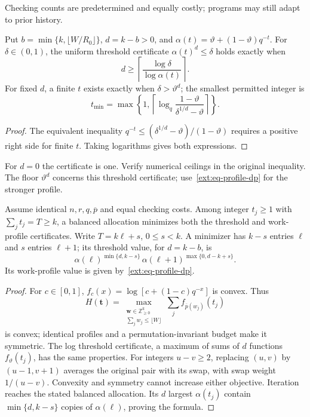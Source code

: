 Checking counts are predetermined and equally costly; programs may still
adapt to prior history.

\begin{corollary}
\label{ext:cor-target}
Put $b=\min\{k,\lfloor W/R_0\rfloor\}$, $d=k-b>0$, and
$\alpha(t)=\vartheta+(1-\vartheta)q^{-t}$.
For $\delta\in(0,1)$, the uniform threshold certificate
$\alpha(t)^d\le\delta$ holds exactly when
\[
d\ge\left\lceil\frac{\log\delta}{\log\alpha(t)}\right\rceil.
\]
For fixed $d$, a finite $t$ exists exactly when $\delta>\vartheta^d$;
the smallest permitted integer is
\begin{equation}
t_{\min}=\max\left\{1,
\left\lceil\log_q\frac{1-\vartheta}{\delta^{1/d}-\vartheta}\right\rceil
\right\}.
\label{ext:eq-target-t}
\end{equation}
\end{corollary}

\begin{proof}
The equivalent inequality
$q^{-t}\le(\delta^{1/d}-\vartheta)/(1-\vartheta)$ requires a positive
right side for finite $t$. Taking logarithms gives both expressions.
\end{proof}

For $d=0$ the certificate is one. Verify numerical ceilings in the original
inequality. The floor $\vartheta^d$ concerns this threshold certificate;
use~\eqref{ext:eq-profile-dp} for the stronger profile.

\begin{theorem}
\label{ext:thm-balanced}
Assume identical $n,r,q,\overline p$ and equal checking costs. Among integer
$t_j\ge1$ with $\sum_jt_j=T\ge k$, a balanced allocation minimizes both
the threshold and work-profile certificates. Write $T=k\ell+s$,
$0\le s<k$. A minimizer has $k-s$ entries $\ell$ and $s$ entries $\ell+1$;
its threshold value, for $d=k-b$, is
\begin{equation}
\alpha(\ell)^{\min\{d,k-s\}}\,
\alpha(\ell+1)^{\max\{0,d-k+s\}}.
\label{ext:eq-balanced-threshold}
\end{equation}
Its work-profile value is given by~\eqref{ext:eq-profile-dp}.
\end{theorem}

\begin{proof}
For $c\in[0,1]$, $f_c(x)=\log[c+(1-c)q^{-x}]$ is convex. Thus
\[
H(\mathbf t)=
\max_{\substack{\mathbf w\in\mathbb Z_{\ge0}^k\\
                \sum_jw_j\le\lfloor W\rfloor}}
\sum_j f_{\overline p(w_j)}(t_j)
\]
is convex; identical profiles and a permutation-invariant budget make it
symmetric. The log threshold certificate, a maximum of sums of $d$
functions $f_\vartheta(t_j)$, has the same properties.
For integers $u-v\ge2$, replacing $(u,v)$ by $(u-1,v+1)$ averages the
original pair with its swap, with swap weight $1/(u-v)$.
Convexity and symmetry cannot increase either objective. Iteration reaches
the stated balanced allocation. Its $d$ largest $\alpha(t_j)$ contain
$\min\{d,k-s\}$ copies of $\alpha(\ell)$, proving the formula.
\end{proof}

